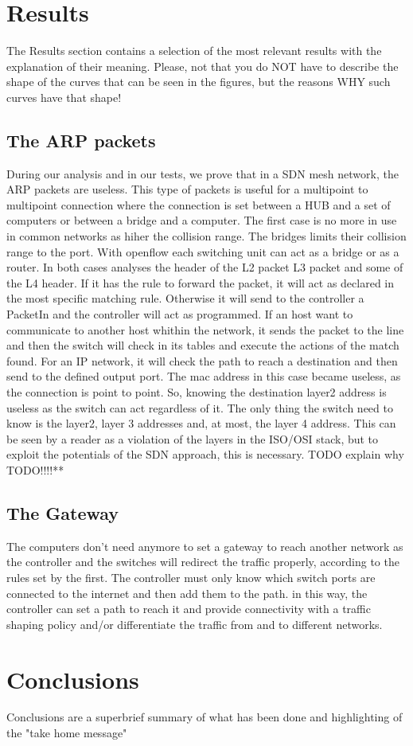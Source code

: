 \documentclass[conference,10pt]{IEEEtran}
\begin{document}
\section{Results}\label{sec:res}
The Results section contains a selection of the most relevant results with the explanation of their meaning. Please, not that you do NOT have to describe the shape of the curves that can be seen in the figures, but the reasons WHY such curves have that shape!
\subsection{The ARP packets}
During our analysis and in our tests, we prove that in a SDN mesh network, the ARP packets are useless.
This type of packets is useful for a multipoint to multipoint connection where the connection is set between a
HUB and a set of computers or between a bridge and a computer. The first case is no more in use in common networks as
hiher the collision range. The bridges limits their collision range to the port. With openflow each switching unit can
act as a bridge or as a router. In both cases analyses the header of the L2 packet L3 packet and some of the L4 header.
If it has the rule to forward the packet, it will act as declared in the most specific matching rule. Otherwise it will
send to the controller a PacketIn and the controller will act as programmed. If an host want to communicate to another host whithin
the network, it sends the packet to the line and then the switch will check in its tables and execute the actions of the match found.
For an IP network, it will check the path to reach a destination and then send to the defined output port. The mac address in this case
became useless, as the connection is point to point. So, knowing the destination layer2 address is useless as the switch can act
regardless of it. The only thing the switch need to know is the layer2, layer 3 addresses and, at most, the layer 4 address.
This can be seen by a reader as a violation of the layers in the ISO/OSI stack, but to exploit the potentials of the SDN approach,
this is necessary. TODO explain why TODO!!!!**

\subsection{The Gateway}
The computers don't need anymore to set a gateway to reach another network as the controller and the switches will redirect the traffic
properly, according to the rules set by the first. The controller must only know which switch ports are connected to the
internet and then add them to the path. in this way, the controller can set a path to reach it and provide connectivity with
a traffic shaping policy and/or differentiate the traffic from and to different networks. 


\section{Conclusions}\label{sec:conclusion}
Conclusions are a superbrief summary of what has been done and highlighting of the "take home message"
\end{document}
